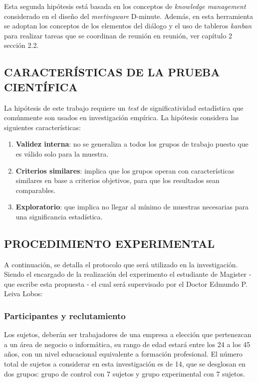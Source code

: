 Esta segunda hipótesis está basada en los conceptos de \textit{knowledge management}  considerado en el diseño del \textit{meetingware} D-minute. Además, en esta herramienta se adoptan los conceptos de los elementos del diálogo y el uso de tableros \textit{kanban} para realizar tareas que se coordinan de reunión en reunión, ver capítulo 2 sección 2.2.

\subsection{CARACTERÍSTICAS DE LA PRUEBA CIENTÍFICA }

La hipótesis de este trabajo requiere un \textit{test} de significatividad estadística que comúnmente son usados en investigación empírica. La hipótesis considera las siguientes características:

\begin{enumerate}[1.]
	\item \textbf{Validez interna}: no se generaliza a todos los grupos de trabajo puesto que es válido solo para la muestra.
	\item \textbf{Criterios similares}: implica que los grupos operan con características similares en base a criterios objetivos, para que los resultados sean comparables.
	\item \textbf{Exploratorio}: que implica no llegar al mínimo de muestras necesarias para una significancia estadística.

\end{enumerate}

\subsection{PROCEDIMIENTO EXPERIMENTAL}

A continuación, se detalla el protocolo que será utilizado en la investigación. Siendo el encargado de la realización del experimento el estudiante de Magister - que escribe esta propuesta - el cual será supervisado por el Doctor Edmundo P. Leiva Lobos:

\subsubsection{Participantes y reclutamiento}

Los sujetos, deberán ser trabajadores de una empresa a elección que pertenezcan a un área de negocio o informática, su rango de edad estará entre los 24 a los 45 años, con un nivel educacional equivalente a formación profesional. El número total de sujetos a considerar en esta investigación es de 14, que se desglosan en dos grupos: grupo de control con 7 sujetos y grupo experimental con 7 sujetos.

